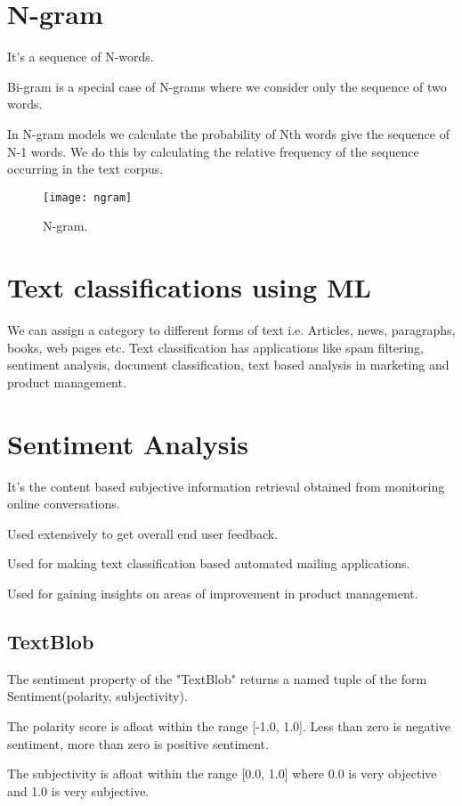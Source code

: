 	\section{N-gram}
	\begin{bulletedlist}
		\item It's a sequence of N-words.
		\item Bi-gram is a special case of N-grams where we consider only the sequence of two words.
		\item In N-gram models we calculate the probability of Nth words give the sequence of N-1 words. We do this by calculating the relative frequency of the sequence occurring in the text corpus.
	\end{bulletedlist}

	\begin{figure}[htb]
		\centering
		\texttt{[image: ngram]}
		\caption[N-gram]{N-gram.}
		\label{fig:ngram}
	\end{figure}

	\section{Text classifications using ML}
We can assign a category to different forms of text i.e. Articles, news, paragraphs, books, web pages etc.  Text classification has applications like spam filtering, sentiment analysis, document classification, text based analysis in marketing and product management.

	\section{Sentiment Analysis}
	\begin{bulletedlist}
		\item It's the content based subjective information retrieval obtained from monitoring online conversations.
		\item Used extensively to get overall end user feedback.
		\item Used for making text classification based automated mailing applications.
		\item Used for gaining insights on areas of improvement in product management.
	\end{bulletedlist}

	\subsection{TextBlob}
The sentiment property of the "TextBlob" returns a named tuple of the form Sentiment(polarity, subjectivity).
	\begin{bulletedlist}
		\item The polarity score is afloat within the range [-1.0, 1.0].  Less than zero is negative sentiment, more than zero is positive sentiment.
		\item The subjectivity is afloat within the range [0.0, 1.0] where 0.0 is very objective and 1.0 is very subjective.
	\end{bulletedlist}

